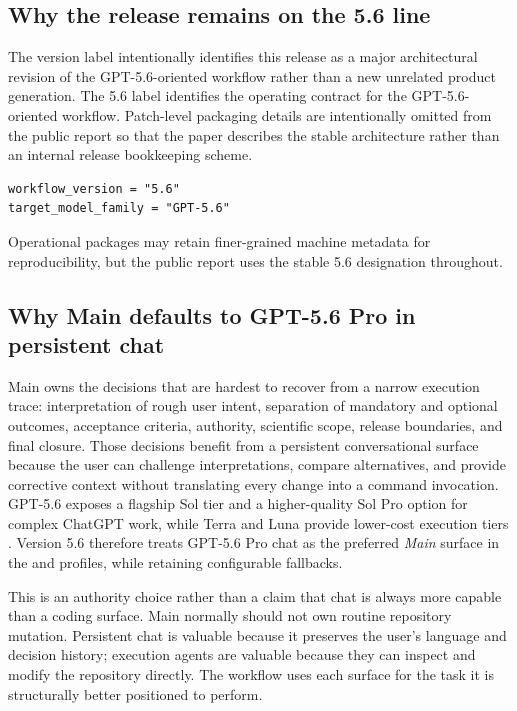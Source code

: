\documentclass[11pt,a4paper]{article}
\newcommand{\code}[1]{\texttt{\detokenize{#1}}}
\begin{document}
\subsection{Why the release remains on the 5.6 line}

The version label \code{5.6.31} intentionally identifies this release as a major architectural revision of the GPT-5.6-oriented workflow rather than a new unrelated product generation. The 5.6 label identifies the operating contract for the GPT-5.6-oriented workflow. Patch-level packaging details are intentionally omitted from the public report so that the paper describes the stable architecture rather than an internal release bookkeeping scheme.

\begin{lstlisting}[style=workflow]
workflow_version = "5.6"
target_model_family = "GPT-5.6"
\end{lstlisting}

Operational packages may retain finer-grained machine metadata for reproducibility, but the public report uses the stable 5.6 designation throughout.

\subsection{Why Main defaults to GPT-5.6 Pro in persistent chat}

Main owns the decisions that are hardest to recover from a narrow execution trace: interpretation of rough user intent, separation of mandatory and optional outcomes, acceptance criteria, authority, scientific scope, release boundaries, and final closure. Those decisions benefit from a persistent conversational surface because the user can challenge interpretations, compare alternatives, and provide corrective context without translating every change into a command invocation. GPT-5.6 exposes a flagship Sol tier and a higher-quality Sol Pro option for complex ChatGPT work, while Terra and Luna provide lower-cost execution tiers \cite{openai56release2026}. Version 5.6 therefore treats GPT-5.6 Pro chat as the preferred \emph{Main} surface in the \code{all} and \code{chatgpt_only} profiles, while retaining configurable fallbacks.

This is an authority choice rather than a claim that chat is always more capable than a coding surface. Main normally should not own routine repository mutation. Persistent chat is valuable because it preserves the user's language and decision history; execution agents are valuable because they can inspect and modify the repository directly. The workflow uses each surface for the task it is structurally better positioned to perform.
\end{document}
